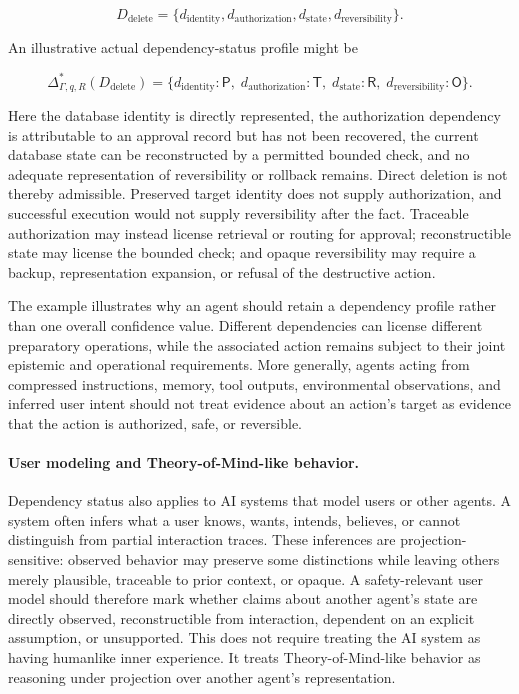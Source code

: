 \documentclass[11pt]{article}
\theoremstyle{definition}
\theoremstyle{remark}
\begin{document}
\[
D_{\mathrm{delete}}
=
\{
d_{\mathrm{identity}},
d_{\mathrm{authorization}},
d_{\mathrm{state}},
d_{\mathrm{reversibility}}
\}.
\]

An illustrative actual dependency-status profile might be

\[
\Delta^{*}_{\Gamma,q,R}(D_{\mathrm{delete}})
=
\{
d_{\mathrm{identity}}:\mathsf P,\;
d_{\mathrm{authorization}}:\mathsf T,\;
d_{\mathrm{state}}:\mathsf R,\;
d_{\mathrm{reversibility}}:\mathsf O
\}.
\]

Here the database identity is directly represented, the authorization dependency is attributable to an approval record but has not been recovered, the current database state can be reconstructed by a permitted bounded check, and no adequate representation of reversibility or rollback remains. Direct deletion is not thereby admissible. Preserved target identity does not supply authorization, and successful execution would not supply reversibility after the fact. Traceable authorization may instead license retrieval or routing for approval; reconstructible state may license the bounded check; and opaque reversibility may require a backup, representation expansion, or refusal of the destructive action.

The example illustrates why an agent should retain a dependency profile rather than one overall confidence value. Different dependencies can license different preparatory operations, while the associated action remains subject to their joint epistemic and operational requirements. More generally, agents acting from compressed instructions, memory, tool outputs, environmental observations, and inferred user intent should not treat evidence about an action's target as evidence that the action is authorized, safe, or reversible.

\paragraph{User modeling and Theory-of-Mind-like behavior.}
Dependency status also applies to AI systems that model users or other agents. A system often infers what a user knows, wants, intends, believes, or cannot distinguish from partial interaction traces. These inferences are projection-sensitive: observed behavior may preserve some distinctions while leaving others merely plausible, traceable to prior context, or opaque. A safety-relevant user model should therefore mark whether claims about another agent's state are directly observed, reconstructible from interaction, dependent on an explicit assumption, or unsupported. This does not require treating the AI system as having humanlike inner experience. It treats Theory-of-Mind-like behavior as reasoning under projection over another agent's representation.
\end{document}
